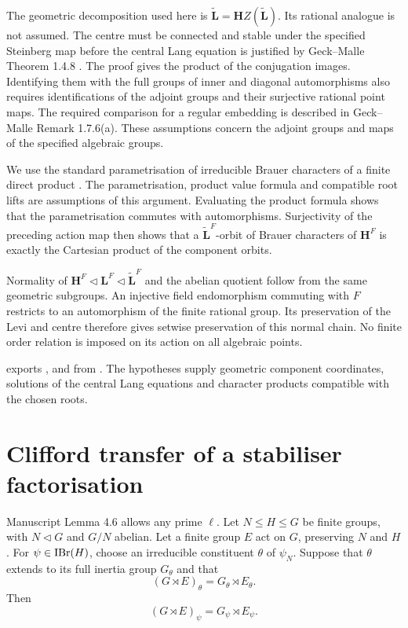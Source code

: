 The geometric decomposition used here is
$\widetilde{\mathbf L}=\mathbf HZ(\widetilde{\mathbf L})$.
Its rational analogue is not assumed. The centre must be connected
and stable under the specified Steinberg map before the central Lang
equation is justified by Geck--Malle Theorem 1.4.8
\cite{GeckMalle2020}. The proof gives the product of the
conjugation images. Identifying them with the full groups of
inner and diagonal automorphisms also requires identifications of the
adjoint groups and their surjective rational point maps. The required
comparison for a regular embedding is described in Geck--Malle
Remark 1.7.6(a). These assumptions concern the adjoint groups and maps
of the specified algebraic groups.

We use the standard parametrisation of irreducible Brauer characters
of a finite direct product \cite[Theorem~8.21]{Navarro1998}. The parametrisation, product value formula
and compatible root lifts are assumptions of this argument. Evaluating the product formula shows that the parametrisation commutes with automorphisms. Surjectivity of the preceding action map then shows that a $\widetilde{\mathbf L}^{F}$-orbit of Brauer characters of $\mathbf H^F$ is exactly the Cartesian product of the component orbits.

Normality of
$\mathbf H^F\lhd\mathbf L^F\lhd\widetilde{\mathbf L}^F$ and the
abelian quotient follow from the same geometric subgroups. An injective
field endomorphism commuting with $F$ restricts to an automorphism of
the finite rational group. Its preservation of the Levi and centre
therefore gives setwise preservation of this normal chain. No finite
order relation is imposed on its action on all algebraic points.

\begin{implementation}
 exports ,
 and 
from .
The hypotheses supply geometric component coordinates, solutions of the
central Lang equations and character products compatible with the chosen
roots.
\end{implementation}

\section{Clifford transfer of a stabiliser factorisation}

Manuscript Lemma 4.6 allows any prime $\ell$. Let $N\leq H\leq G$
be finite groups, with $N\lhd G$ and $G/N$ abelian. Let a finite group
$E$ act on $G$, preserving $N$ and $H$. For $\psi\in\operatorname{IBr}(H)$, choose
an irreducible constituent $\theta$ of $\psi_N$. Suppose that $\theta$
extends to its full inertia group $G_\theta$ and that
\[
 (G\rtimes E)_\theta=G_\theta\rtimes E_\theta.
\]
Then
\[
 (G\rtimes E)_\psi=G_\psi\rtimes E_\psi.
\]

